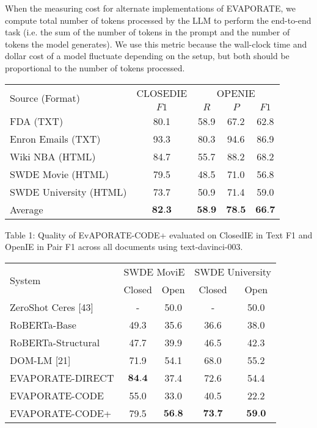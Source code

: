 \documentclass[10pt]{article}
\begin{document}
When the measuring cost for alternate implementations of EVAPORATE, we compute total number of tokens processed by the LLM to perform the end-to-end task (i.e. the sum of the number of tokens in the prompt and the number of tokens the model generates). We use this metric because the wall-clock time and dollar cost of a model fluctuate depending on the setup, but both should be proportional to the number of tokens processed.

\begin{center}
\begin{tabular}{lc|ccc}
\hline
\multirow{2}{*}{Source (Format)} & CLOSEDIE & \multicolumn{3}{c}{OPENIE} \\
 & $F 1$ & $R$ & $P$ & $F 1$ \\
\hline
FDA (TXT) & 80.1 & 58.9 & 67.2 & 62.8 \\
Enron Emails (TXT) & 93.3 & 80.3 & 94.6 & 86.9 \\
Wiki NBA (HTML) & 84.7 & 55.7 & 88.2 & 68.2 \\
SWDE Movie (HTML) & 79.5 & 48.5 & 71.0 & 56.8 \\
SWDE University (HTML) & 73.7 & 50.9 & 71.4 & 59.0 \\
\hline
Average & $\mathbf{8 2 . 3}$ & $\mathbf{5 8 . 9}$ & $\mathbf{7 8 . 5}$ & $\mathbf{6 6 . 7}$ \\
\hline
\end{tabular}
\end{center}

Table 1: Quality of EvAPORATE-CODE+ evaluated on ClosedIE in Text F1 and OpenIE in Pair F1 across all documents using text-davinci-003.

\begin{center}
\begin{tabular}{lcc|cc}
\hline
\multirow{2}{*}{System} & \multicolumn{2}{c}{SWDE MoviE} & \multicolumn{2}{c}{SWDE University} \\
 & Closed & Open & Closed & Open \\
\hline
ZeroShot Ceres [43] & - & 50.0 & - & 50.0 \\
RoBERTa-Base & 49.3 & 35.6 & 36.6 & 38.0 \\
RoBERTa-Structural & 47.7 & 39.9 & 46.5 & 42.3 \\
DOM-LM [21] & 71.9 & 54.1 & 68.0 & 55.2 \\
\hline
EVAPORATE-DIRECT & $\mathbf{8 4 . 4}$ & 37.4 & 72.6 & 54.4 \\
EVAPORATE-CODE & 55.0 & 33.0 & 40.5 & 22.2 \\
EVAPORATE-CODE+ & 79.5 & $\mathbf{5 6 . 8}$ & $\mathbf{7 3 . 7}$ & $\mathbf{5 9 . 0}$ \\
\hline
\end{tabular}
\end{center}
\end{document}
